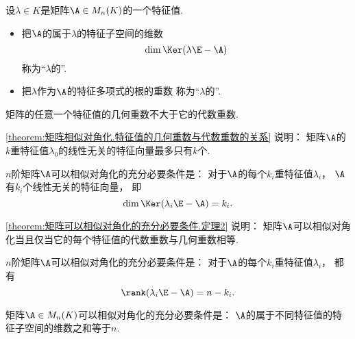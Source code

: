 \begin{definition}
设\(\lambda \in K\)是矩阵\(\A \in M_n(K)\)的一个特征值.
\begin{itemize}
	\item 把\(\A\)的属于\(\lambda\)的特征子空间的维数\[
		\dim\Ker(\lambda\E-\A)
	\]称为“\(\lambda\)的”.
	\item 把\(\lambda\)作为\(\A\)的特征多项式的根的重数
	称为“\(\lambda\)的”.
\end{itemize}
\end{definition}
\begin{theorem}\label{theorem:矩阵相似对角化.特征值的几何重数与代数重数的关系}
矩阵的任意一个特征值的几何重数不大于它的代数重数.
\end{theorem}
\begin{remark}
\cref{theorem:矩阵相似对角化.特征值的几何重数与代数重数的关系} 说明：
矩阵\(\A\)的\(k\)重特征值\(\lambda_0\)的线性无关的特征向量最多只有\(k\)个.
\end{remark}

\begin{theorem}\label{theorem:矩阵可以相似对角化的充分必要条件.定理2}
\(n\)阶矩阵\(\A\)可以相似对角化的充分必要条件是：
对于\(\A\)的每个\(k_i\)重特征值\(\lambda_i\)，
\(\A\)有\(k_i\)个线性无关的特征向量，
即\[
	\dim\Ker(\lambda_i\E-\A) = k_i.
\]
\end{theorem}
\begin{remark}
\cref{theorem:矩阵可以相似对角化的充分必要条件.定理2} 说明：
矩阵\(\A\)可以相似对角化当且仅当它的每个特征值的代数重数与几何重数相等.
\end{remark}

\begin{corollary}\label{theorem:矩阵可以相似对角化的充分必要条件.定理3}
\(n\)阶矩阵\(\A\)可以相似对角化的充分必要条件是：
对于\(\A\)的每个\(k_i\)重特征值\(\lambda_i\)，
都有\[
	\rank(\lambda_i\E-\A) = n-k_i.
\]
\end{corollary}

\begin{theorem}\label{theorem:矩阵可以相似对角化的充分必要条件.定理4}
矩阵\(\A \in M_n(K)\)可以相似对角化的充分必要条件是：
\(\A\)的属于不同特征值的特征子空间的维数之和等于\(n\).
\end{theorem}

